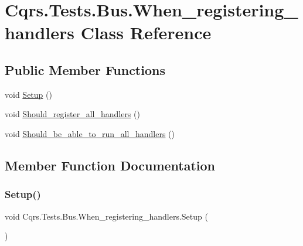 \hypertarget{classCqrs_1_1Tests_1_1Bus_1_1When__registering__handlers}{}\section{Cqrs.\+Tests.\+Bus.\+When\+\_\+registering\+\_\+handlers Class Reference}
\label{classCqrs_1_1Tests_1_1Bus_1_1When__registering__handlers}
\subsection*{Public Member Functions}
\begin{DoxyCompactItemize}
\item 
void \hyperlink{classCqrs_1_1Tests_1_1Bus_1_1When__registering__handlers_ab61fae616b3c6f1af8343dcf4c4abe36_ab61fae616b3c6f1af8343dcf4c4abe36}{Setup} ()
\item 
void \hyperlink{classCqrs_1_1Tests_1_1Bus_1_1When__registering__handlers_a8f41a12f1de270204fba571220948411_a8f41a12f1de270204fba571220948411}{Should\+\_\+register\+\_\+all\+\_\+handlers} ()
\item 
void \hyperlink{classCqrs_1_1Tests_1_1Bus_1_1When__registering__handlers_a8e91b8af597ea769f4239b40d148347c_a8e91b8af597ea769f4239b40d148347c}{Should\+\_\+be\+\_\+able\+\_\+to\+\_\+run\+\_\+all\+\_\+handlers} ()
\end{DoxyCompactItemize}


\subsection{Member Function Documentation}
\mbox{\label{classCqrs_1_1Tests_1_1Bus_1_1When__registering__handlers_ab61fae616b3c6f1af8343dcf4c4abe36_ab61fae616b3c6f1af8343dcf4c4abe36}} 
\subsubsection{\texorpdfstring{Setup()}{Setup()}}
{\footnotesize\ttfamily void Cqrs.\+Tests.\+Bus.\+When\+\_\+registering\+\_\+handlers.\+Setup (\begin{DoxyParamCaption}{ }\end{DoxyParamCaption})}


